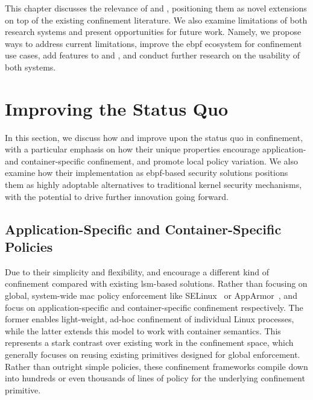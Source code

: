 This chapter discusses the relevance of \bpfbox{} and \bpfcontain{}, positioning them as
novel extensions on top of the existing confinement literature. We also examine
limitations of both research systems and present opportunities for future work. Namely, we
propose ways to address current limitations, improve the \gls{ebpf} ecosystem for
confinement use cases, add features to \bpfbox{} and \bpfcontain{}, and conduct further
research on the usability of both systems.

\section{Improving the Status Quo}%
\label{s:disc-improving}

In this section, we discuss how \bpfbox{} and \bpfcontain{} improve upon the status quo in
confinement, with a particular emphasis on how their unique properties encourage
application- and container-specific confinement, and promote local policy variation. We
also examine how their implementation as \gls{ebpf}-based security solutions positions
them as highly adoptable alternatives to traditional kernel security mechanisms, with the
potential to drive further innovation going forward.

\subsection{Application-Specific and Container-Specific Policies}

Due to their simplicity and flexibility, \bpfbox{} and \bpfcontain{} encourage a different
kind of confinement compared with existing \gls{lsm}-based solutions. Rather than focusing
on global, system-wide \gls{mac} policy enforcement like
SELinux~\cite{smalley2001_selinux} or AppArmor~\cite{cowan2000_apparmor}, \bpfbox{} and
\bpfcontain{} focus on application-specific and container-specific confinement
respectively. The former enables light-weight, ad-hoc confinement of individual Linux
processes, while the latter extends this model to work with container semantics.  This
represents a stark contrast over existing work in the confinement space, which generally
focuses on reusing existing primitives designed for global enforcement.  Rather than
outright simple policies, these confinement frameworks compile down into hundreds or even
thousands of lines of policy for the underlying confinement primitive.

